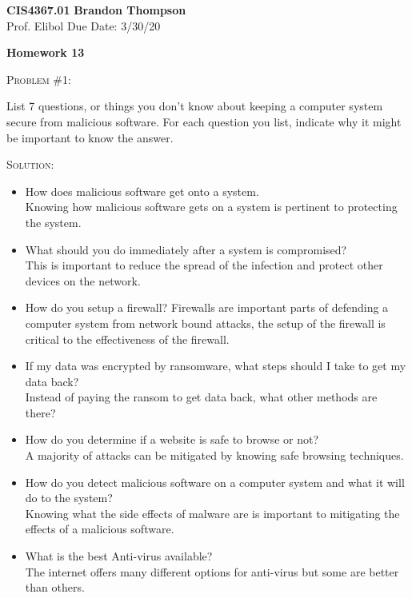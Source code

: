 \documentclass[12pt]{article}
\newenvironment{problem}[1]
{\begin{mdframed}[linewidth=0.8pt]
        \textsc{Problem #1:}

}
    {\end{mdframed}}
\newenvironment{solution}
    {\textsc{Solution:}\\}
    {\newpage}%
\begin{document}
\noindent
\textbf{CIS4367.01} \hfill \textbf{Brandon Thompson} \\
\normalsize Prof. Elibol \hfill Due Date: 3/30/20 \\

\begin{center}
\textbf{Homework 13}
\end{center}
\begin{problem}{\#1}
		List 7 questions, or things you don't know about keeping a computer system secure from malicious software. For each question you list, indicate why it might be important to know the answer.
	\end{problem}
	\begin{solution}
	\begin{itemize}
		\item How does malicious software get onto a system.\\
			Knowing how malicious software gets on a system is pertinent to protecting the system.
		\item What should you do immediately after a system is compromised?\\
			This is important to reduce the spread of the infection and protect other devices on the network.
		\item How do you setup a firewall?
			Firewalls are important parts of defending a computer system from network bound attacks, the setup of the firewall is critical to the effectiveness of the firewall.
		\item If my data was encrypted by ransomware, what steps should I take to get my data back?\\
			Instead of paying the ransom to get data back, what other methods are there?
		\item How do you determine if a website is safe to browse or not?\\
			A majority of attacks can be mitigated by knowing safe browsing techniques.
		\item How do you detect malicious software on a computer system and what it will do to the system?\\
			Knowing what the side effects of malware are is important to mitigating the effects of a malicious software.
		\item What is the best Anti-virus available?\\
			The internet offers many different options for anti-virus but some are better than others.
	\end{itemize}
	\end{solution}
\end{document}
